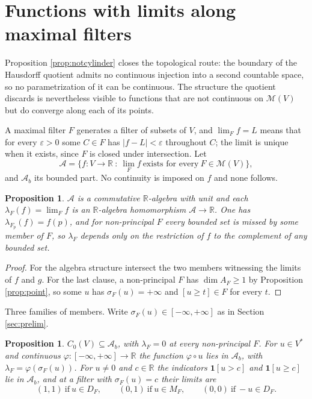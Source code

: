 \documentclass[11pt]{amsart}
\theoremstyle{plain}
\newtheorem{proposition}[theorem]{Proposition}
\theoremstyle{definition}
\newcommand{\AAA}{\mathscr{A}}
\newcommand{\RR}{\mathbb{R}}
\newcommand{\Vs}{V^{*}}
\begin{document}
\section{Functions with limits along maximal filters}\label{sec:alg}

Proposition \ref{prop:notcylinder} closes the topological route: the boundary of the Hausdorff quotient admits no continuous injection into a second countable space, so no parametrization of it can be continuous. The structure the quotient discards is nevertheless visible to functions that are not continuous on $\mathcal{M}(V)$ but do converge along each of its points.

A maximal filter $F$ generates a filter of subsets of $V$, and $\lim_Ff=L$ means that for every $\varepsilon>0$ some $C\in F$ has $|f-L|<\varepsilon$ throughout $C$; the limit is unique when it exists, since $F$ is closed under intersection. Let
\[
\AAA=\{f:V\to\RR\ :\ \lim_Ff\ \text{exists for every}\ F\in\mathcal{M}(V)\},
\]
and $\AAA_b$ its bounded part. No continuity is imposed on $f$ and none follows.

\begin{proposition}\label{prop:algebra}
$\AAA$ is a commutative $\RR$-algebra with unit and each $\lambda_F(f)=\lim_Ff$ is an $\RR$-algebra homomorphism $\AAA\to\RR$. One has $\lambda_{F_p}(f)=f(p)$, and for non-principal $F$ every bounded set is missed by some member of $F$, so $\lambda_F$ depends only on the restriction of $f$ to the complement of any bounded set.
\end{proposition}

\begin{proof}
For the algebra structure intersect the two members witnessing the limits of $f$ and $g$. For the last clause, a non-principal $F$ has $\dim A_F\ge1$ by Proposition \ref{prop:point}, so some $u$ has $\sigma_F(u)=+\infty$ and $[u\ge t]\in F$ for every $t$.
\end{proof}

Three families of members. Write $\sigma_F(u)\in[-\infty,+\infty]$ as in Section \ref{sec:prelim}.

\begin{proposition}\label{prop:members}
$C_0(V)\subseteq\AAA_b$, with $\lambda_F=0$ at every non-principal $F$. For $u\in\Vs$ and continuous $\varphi:[-\infty,+\infty]\to\RR$ the function $\varphi\circ u$ lies in $\AAA_b$, with $\lambda_F=\varphi(\sigma_F(u))$. For $u\neq0$ and $c\in\RR$ the indicators $\mathbf{1}[u>c]$ and $\mathbf{1}[u\ge c]$ lie in $\AAA_b$, and at a filter with $\sigma_F(u)=c$ their limits are
\[
(1,1)\ \text{if}\ u\in D_F,\qquad(0,1)\ \text{if}\ u\in M_F,\qquad(0,0)\ \text{if}\ -u\in D_F.
\]
\end{proposition}
\end{document}

